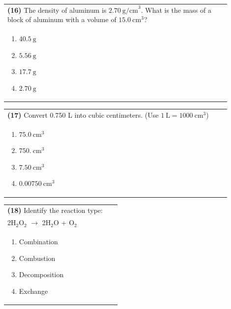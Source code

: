 \documentclass{article}
\begin{document}
\noindent\begin{tabular}{|p{0.9\linewidth}|}
\hline
\textbf{(16)} The density of aluminum is $2.70~\text{g/cm}^3$. What is the mass of a block of aluminum with a volume of $15.0~\text{cm}^3$? \\
\begin{minipage}[t]{0.85\linewidth}
\begin{enumerate}[label=\alph*.]
    \item $40.5~\text{g}$
    \item $5.56~\text{g}$
    \item $17.7~\text{g}$
    \item $2.70~\text{g}$
\end{enumerate}
\end{minipage}\\[0.2cm]
\hline
\end{tabular}

\noindent\begin{tabular}{|p{0.9\linewidth}|}
\hline
\textbf{(17)} Convert 0.750 L into cubic centimeters. (Use $1~\text{L} = 1000~\text{cm}^3$) \\
\begin{minipage}[t]{0.85\linewidth}
\begin{enumerate}[label=\alph*.]
    \item $75.0~\text{cm}^3$
    \item $750.~\text{cm}^3$
    \item $7.50~\text{cm}^3$
    \item $0.00750~\text{cm}^3$
\end{enumerate}
\end{minipage}\\[0.2cm]
\hline
\end{tabular}

\noindent\begin{tabular}{|p{0.9\linewidth}|}
\hline
\textbf{(18)} Identify the reaction type:\\[0.2cm]
2H$_2$O$_2$ $\rightarrow$ 2H$_2$O + O$_2$\\[0.2cm]
\begin{minipage}[t]{0.85\linewidth}
\begin{enumerate}[label=\alph*.]
\item Combination
\item Combustion
\item Decomposition
\item Exchange
\end{enumerate}
\end{minipage}\\[0.2cm]
\hline
\end{tabular}
\end{document}
